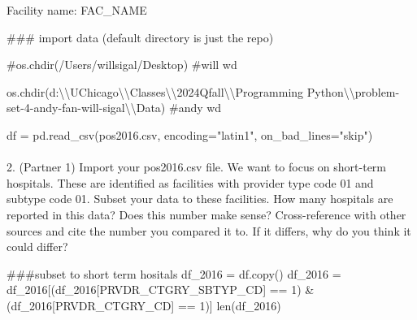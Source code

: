 \documentclass[
  letterpaper,
  DIV=11,
  numbers=noendperiod]{scrartcl}
\makeatletter
\let\oldparagraph\paragraph
\renewcommand{\paragraph}{
    \@ifstar
      \xxxParagraphStar
      \xxxParagraphNoStar
  }
\newcommand{\xxxParagraphStar}[1]{\oldparagraph*{#1}\mbox{}}
\newcommand{\xxxParagraphNoStar}[1]{\oldparagraph{#1}\mbox{}}
\newenvironment{Shaded}{\begin{snugshade}}{\end{snugshade}}
\newcommand{\BuiltInTok}[1]{\textcolor[rgb]{0.00,0.23,0.31}{#1}}
\newcommand{\CharTok}[1]{\textcolor[rgb]{0.13,0.47,0.30}{#1}}
\newcommand{\CommentTok}[1]{\textcolor[rgb]{0.37,0.37,0.37}{#1}}
\newcommand{\DecValTok}[1]{\textcolor[rgb]{0.68,0.00,0.00}{#1}}
\newcommand{\NormalTok}[1]{\textcolor[rgb]{0.00,0.23,0.31}{#1}}
\newcommand{\OperatorTok}[1]{\textcolor[rgb]{0.37,0.37,0.37}{#1}}
\newcommand{\StringTok}[1]{\textcolor[rgb]{0.13,0.47,0.30}{#1}}
\makeatother
\begin{document}
Facility name: FAC\_NAME

\begin{Shaded}
\begin{Highlighting}[]
\CommentTok{\#\#\# import data (default directory is just the repo)}

\CommentTok{\#os.chdir(\textquotesingle{}/Users/willsigal/Desktop\textquotesingle{}) \#will wd}

\NormalTok{os.chdir(}\StringTok{\textquotesingle{}d:}\CharTok{\textbackslash{}\textbackslash{}}\StringTok{UChicago}\CharTok{\textbackslash{}\textbackslash{}}\StringTok{Classes}\CharTok{\textbackslash{}\textbackslash{}}\StringTok{2024Qfall}\CharTok{\textbackslash{}\textbackslash{}}\StringTok{Programming Python}\CharTok{\textbackslash{}\textbackslash{}}\StringTok{problem{-}set{-}4{-}andy{-}fan{-}will{-}sigal}\CharTok{\textbackslash{}\textbackslash{}}\StringTok{Data\textquotesingle{}}\NormalTok{) }\CommentTok{\#andy wd}

\NormalTok{df }\OperatorTok{=}\NormalTok{ pd.read\_csv(}\StringTok{\textquotesingle{}pos2016.csv\textquotesingle{}}\NormalTok{, encoding}\OperatorTok{=}\StringTok{"latin1"}\NormalTok{, on\_bad\_lines}\OperatorTok{=}\StringTok{"skip"}\NormalTok{)}
\end{Highlighting}
\end{Shaded}

\paragraph{2. (Partner 1) Import your pos2016.csv file. We want to focus
on short-term hospitals. These are identified as facilities with
provider type code 01 and subtype code 01. Subset your data to these
facilities. How many hospitals are reported in this data? Does this
number make sense? Cross-reference with other sources and cite the
number you compared it to. If it differs, why do you think it could
differ?}\label{partner-1-import-your-pos2016.csv-file.-we-want-to-focus-on-short-term-hospitals.-these-are-identified-as-facilities-with-provider-type-code-01-and-subtype-code-01.-subset-your-data-to-these-facilities.-how-many-hospitals-are-reported-in-this-data-does-this-number-make-sense-cross-reference-with-other-sources-and-cite-the-number-you-compared-it-to.-if-it-differs-why-do-you-think-it-could-differ}

\begin{Shaded}
\begin{Highlighting}[]
\CommentTok{\#\#\#subset to short term hositals}
\NormalTok{df\_2016 }\OperatorTok{=}\NormalTok{ df.copy()}
\NormalTok{df\_2016 }\OperatorTok{=}\NormalTok{ df\_2016[(df\_2016[}\StringTok{\textquotesingle{}PRVDR\_CTGRY\_SBTYP\_CD\textquotesingle{}}\NormalTok{] }\OperatorTok{==} \DecValTok{1}\NormalTok{) }\OperatorTok{\&}\NormalTok{ (df\_2016[}\StringTok{\textquotesingle{}PRVDR\_CTGRY\_CD\textquotesingle{}}\NormalTok{] }\OperatorTok{==} \DecValTok{1}\NormalTok{)]}
\BuiltInTok{len}\NormalTok{(df\_2016)}
\end{Highlighting}
\end{Shaded}
\end{document}
